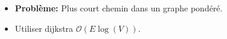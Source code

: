 \begin{frame}
    \frametitle{\problemtitle}
    \begin{itemize}
        \item<+-> \textbf{Problème:} Plus court chemin dans un graphe pondéré.
        \item<+-> Utiliser dijkstra $\mathcal O(E \log (V))$.
    \end{itemize}
\end{frame}
